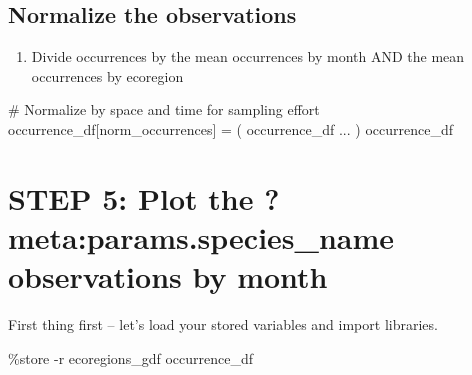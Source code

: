 \documentclass[
  letterpaper,
  DIV=11,
  numbers=noendperiod,
  oneside]{scrreprt}
\newenvironment{Shaded}{\begin{snugshade}}{\end{snugshade}}
\newcommand{\CommentTok}[1]{\textcolor[rgb]{0.37,0.37,0.37}{#1}}
\newcommand{\NormalTok}[1]{\textcolor[rgb]{0.00,0.23,0.31}{#1}}
\newcommand{\OperatorTok}[1]{\textcolor[rgb]{0.37,0.37,0.37}{#1}}
\newcommand{\StringTok}[1]{\textcolor[rgb]{0.13,0.47,0.30}{#1}}
\providecommand{\tightlist}{%
  \setlength{\itemsep}{0pt}\setlength{\parskip}{0pt}}
\begin{document}
\subsection{Normalize the
observations}\label{normalize-the-observations}

\begin{tcolorbox}[enhanced jigsaw, colbacktitle=quarto-callout-color!10!white, opacityback=0, bottomtitle=1mm, toptitle=1mm, bottomrule=.15mm, left=2mm, colframe=quarto-callout-color-frame, leftrule=.75mm, opacitybacktitle=0.6, colback=white, rightrule=.15mm, toprule=.15mm, breakable, titlerule=0mm, title=\textcolor{quarto-callout-color}{\faInfo}\hspace{0.5em}{Try It: Normalize}, coltitle=black, arc=.35mm]

\begin{enumerate}
\def\labelenumi{\arabic{enumi}.}
\tightlist
\item
  Divide occurrences by the mean occurrences by month AND the mean
  occurrences by ecoregion
\end{enumerate}

\end{tcolorbox}

\begin{Shaded}
\begin{Highlighting}[]
\CommentTok{\# Normalize by space and time for sampling effort}
\NormalTok{occurrence\_df[}\StringTok{\textquotesingle{}norm\_occurrences\textquotesingle{}}\NormalTok{] }\OperatorTok{=}\NormalTok{ (}
\NormalTok{    occurrence\_df}
\NormalTok{    ...}
\NormalTok{)}
\NormalTok{occurrence\_df}
\end{Highlighting}
\end{Shaded}

\section{\texorpdfstring{STEP 5: Plot the
\textbf{?meta:params.species\_name} observations by
month}{STEP 5: Plot the ?meta:params.species\_name observations by month}}\label{step-5-plot-the-observations-by-month}

First thing first -- let's load your stored variables and import
libraries.

\begin{Shaded}
\begin{Highlighting}[]
\OperatorTok{\%}\NormalTok{store }\OperatorTok{{-}}\NormalTok{r ecoregions\_gdf occurrence\_df}
\end{Highlighting}
\end{Shaded}
\end{document}
